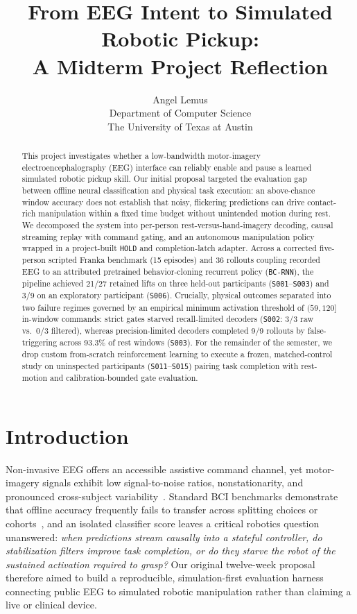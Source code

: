 \documentclass{article}
\title{From EEG Intent to Simulated Robotic Pickup:\\A Midterm Project Reflection}
\author{
  Angel Lemus\\
  Department of Computer Science\\
  The University of Texas at Austin\\
}
\begin{document}
\maketitle

\begin{abstract}
This project investigates whether a low-bandwidth motor-imagery electroencephalography (EEG) interface can reliably enable and pause a learned simulated robotic pickup skill. Our initial proposal targeted the evaluation gap between offline neural classification and physical task execution: an above-chance window accuracy does not establish that noisy, flickering predictions can drive contact-rich manipulation within a fixed time budget without unintended motion during rest. We decomposed the system into per-person rest-versus-hand-imagery decoding, causal streaming replay with command gating, and an autonomous manipulation policy wrapped in a project-built \texttt{HOLD} and completion-latch adapter. Across a corrected five-person scripted Franka benchmark (15 episodes) and 36 rollouts coupling recorded EEG to an attributed pretrained behavior-cloning recurrent policy (\texttt{BC-RNN}), the pipeline achieved 21/27 retained lifts on three held-out participants (\texttt{S001}--\texttt{S003}) and 3/9 on an exploratory participant (\texttt{S006}). Crucially, physical outcomes separated into two failure regimes governed by an empirical minimum activation threshold of $(59, 120]$ in-window commands: strict gates starved recall-limited decoders (\texttt{S002}: 3/3 raw vs.\ 0/3 filtered), whereas precision-limited decoders completed 9/9 rollouts by false-triggering across 93.3\% of rest windows (\texttt{S003}). For the remainder of the semester, we drop custom from-scratch reinforcement learning to execute a frozen, matched-control study on uninspected participants (\texttt{S011}--\texttt{S015}) pairing task completion with rest-motion and calibration-bounded gate evaluation.
\end{abstract}

\section{Introduction}

Non-invasive EEG offers an accessible assistive command channel, yet motor-imagery signals exhibit low signal-to-noise ratios, nonstationarity, and pronounced cross-subject variability~\citep{mcfarland2017,lotte2018}. Standard BCI benchmarks demonstrate that offline accuracy frequently fails to transfer across splitting choices or cohorts~\citep{jayaram2018}, and an isolated classifier score leaves a critical robotics question unanswered: \emph{when predictions stream causally into a stateful controller, do stabilization filters improve task completion, or do they starve the robot of the sustained activation required to grasp?} Our original twelve-week proposal therefore aimed to build a reproducible, simulation-first evaluation harness connecting public EEG to simulated robotic manipulation rather than claiming a live or clinical device.
\end{document}
